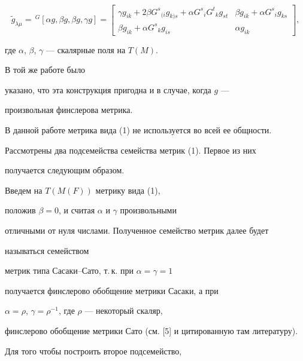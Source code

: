 \begin{equation}


\widetilde{g}_{\lambda \mu} =


\,{}^G[\alpha g , \beta g , \beta g , \gamma g] =


\begin{bmatrix}


\gamma g_{ik} + 2\beta G^{s}{}_{(i}g_{k)s} +


\alpha G^{s}{}_{i}G^{t}{}_{k}g_{st}&


\beta g_{ik} + \alpha G^{s}{}_{i}g_{ks}\\


\beta g_{ik} + \alpha G^{s}{}_{k}g_{is}&


\alpha g_{ik}


\end{bmatrix}


, 


\end{equation}


где $\alpha$, $\beta$, $\gamma $ --- скалярные поля на $T(M)$.


В той же работе было


указано, что эта конструкция пригодна и в случае, когда $g$ ---


произвольная финслерова метрика.





В данной работе метрика вида (1) не используется во всей ее общности.


Рассмотрены два подсемейства семейства метрик (1). Первое из них


получается следующим образом.


Введем на $T(M(F))$ метрику вида (1),


положив $\beta=0$, и считая $\alpha$ и $\gamma$ произвольными


отличными от нуля числами. Полученное семейство метрик далее будет


называться семейством


метрик типа Сасаки--Сато, т.\,к. при $\alpha = \gamma = 1$


получается финслерово обобщение метрики Сасаки, а при


$\alpha = \rho $, $\gamma = \rho^{-1}$, где $\rho $ --- некоторый скаляр,


финслерово обобщение метрики Сато (см. [5] и цитированную там литературу).


Для того чтобы построить второе подсемейство,


